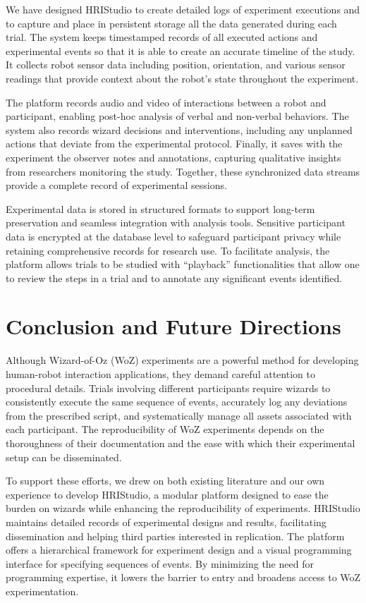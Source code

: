\documentclass[letterpaper, 10 pt, conference]{subfiles/ieeeconf}
\begin{document}
We have designed HRIStudio to create detailed logs of experiment executions and to capture and place in persistent storage all the data generated during each trial. The system keeps timestamped records of all executed actions and experimental events so that it is able to create an accurate timeline of the study. It collects robot sensor data including position, orientation, and various sensor readings that provide context about the robot's state throughout the experiment. 

The platform records audio and video of interactions between a robot and participant, enabling post-hoc analysis of verbal and non-verbal behaviors. The system also records wizard decisions and interventions, including any unplanned actions that deviate from the experimental protocol. Finally, it saves with the experiment the observer notes and annotations, capturing qualitative insights from researchers monitoring the study. Together, these synchronized data streams provide a complete record of experimental sessions. 

Experimental data is stored in structured formats to support long-term preservation and seamless integration with analysis tools. Sensitive participant data is encrypted at the database level to safeguard participant privacy while retaining comprehensive records for research use. To facilitate analysis, the platform allows trials to be studied with ``playback'' functionalities that allow one to review the steps in a trial and to annotate any significant events identified.

\section{Conclusion and Future Directions}
\label{conclusion}
 
Although Wizard-of-Oz (WoZ) experiments are a powerful method for developing human-robot interaction applications, they demand careful attention to procedural details. Trials involving different participants require wizards to consistently execute the same sequence of events, accurately log any deviations from the prescribed script, and systematically manage all assets associated with each participant. The reproducibility of WoZ experiments depends on the thoroughness of their documentation and the ease with which their experimental setup can be disseminated.

To support these efforts, we drew on both existing literature and our own experience to develop HRIStudio, a modular platform designed to ease the burden on wizards while enhancing the reproducibility of experiments. \mbox{HRIStudio} maintains detailed records of experimental designs and results, facilitating dissemination and helping third parties interested in replication. The platform offers a hierarchical framework for experiment design and a visual programming interface for specifying sequences of events. By minimizing the need for programming expertise, it lowers the barrier to entry and broadens access to WoZ experimentation.
\end{document}
